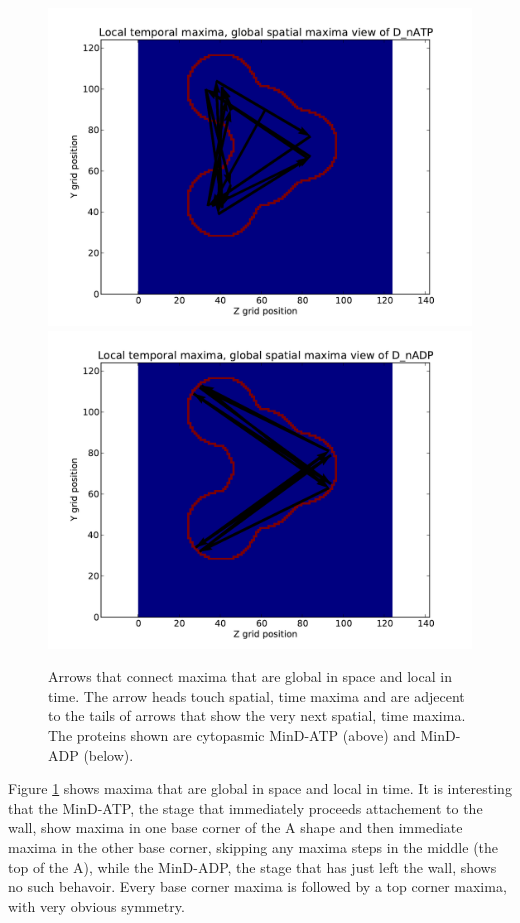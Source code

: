 \documentclass[letterpaper,twocolumn,amsmath,amssymb,pre]{revtex4-1}
\begin{document}
\begin{figure}
  \includegraphics[width=\columnwidth]{../data/shape-randst/plots/arrow-plot-D_nATP-randst-25-600-600-9900-1500}
  \includegraphics[width=\columnwidth]{../data/shape-randst/plots/arrow-plot-D_nADP-randst-25-600-600-9900-1500}
  \caption{Arrows that connect maxima that are global in space and
    local in time. The arrow heads touch spatial, time maxima and are
    adjecent to the tails of arrows that show the very next spatial,
    time maxima. The proteins shown are cytopasmic MinD-ATP (above) and MinD-ADP (below).}
  \label{arrow-plot-randst-99-plot}
\end{figure}
Figure \ref{arrow-plot-randst-99-plot} shows maxima that are global in
space and local in time.  It is interesting that the MinD-ATP, the
stage that immediately proceeds attachement to the wall, show maxima
in one base corner of the A shape and then immediate maxima in the
other base corner, skipping any maxima steps in the middle (the top of
the A), while the MinD-ADP, the stage that has just left the wall,
shows no such behavoir.  Every base corner maxima is followed by a top
corner maxima, with very obvious symmetry.
\end{document}
